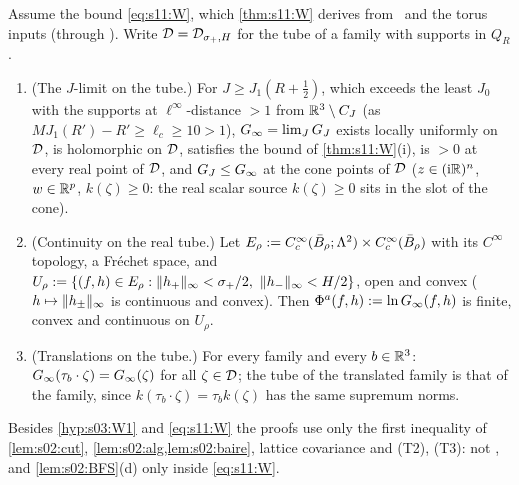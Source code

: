 \begin{lemma}\label{lem:s11:TWtube}
Assume the bound \eqref{eq:s11:W}, which \cref{thm:s11:W} derives from \Tthree\ and the torus inputs (through \Itwo). Write $\mathcal D=\mathcal D_{\sigma_+,H}$ for the tube of a family with supports in $Q_R$.
\begin{enumerate}[label=\textup{(\roman*)},leftmargin=*,start=3]
\item \textup{(The $J$-limit on the tube.)} For $J\ge J_1(R+\frac12)$, which exceeds the least $J_0$ with the supports at $\ell^\infty$-distance $>1$ from $\mathbb R^3\setminus C_J$ (as $MJ_1(R')-R'\ge\ell_c\ge10>1$), $G_\infty=\lim_JG_J$ exists locally uniformly on $\mathcal D$, is holomorphic on $\mathcal D$, satisfies the bound of \cref{thm:s11:W}\textup{(i)}, is $>0$ at every real point of $\mathcal D$, and $G_J\le G_\infty$ at the cone points of $\mathcal D$ ($z\in(\mathrm i\mathbb R)^n$, $w\in\mathbb R^p$, $k(\zeta)\ge0$: the real scalar source $k(\zeta)\ge0$ sits in the slot of the cone).
\item \textup{(Continuity on the real tube.)} Let $E_\rho:= C^\infty_c(\bar B_\rho;\Lambda^2)\times C^\infty_c(\bar B_\rho)$ with its $C^\infty$ topology, a Fr\'echet space, and $U_\rho\defeq\{(f,h)\in E_\rho:\norm{h_+}_\infty<\sigma_+/2,\ \norm{h_-}_\infty<H/2\}$, open and convex ($h\mapsto\lVert h_\pm\rVert_\infty$ is continuous and convex). Then $\Phi^a(f,h):=\ln G_\infty(f,h)$ is finite, convex and continuous on $U_\rho$.
\item \textup{(Translations on the tube.)} For every family and every $b\in\mathbb R^3$: $G_\infty(\tau_b\cdot\zeta)=G_\infty(\zeta)$ for all $\zeta\in\mathcal D$; the tube of the translated family is that of the family, since $k(\tau_b\cdot\zeta)=\tau_bk(\zeta)$ has the same supremum norms.
\end{enumerate}
Besides \cref{hyp:s03:W1} and \eqref{eq:s11:W} the proofs use only the first inequality of \cref{lem:s02:cut}, \cref{lem:s02:alg,lem:s02:baire}, lattice covariance and (T2), (T3): not \Wtwo, and \cref{lem:s02:BFS}(d) only inside \eqref{eq:s11:W}.
\end{lemma}

